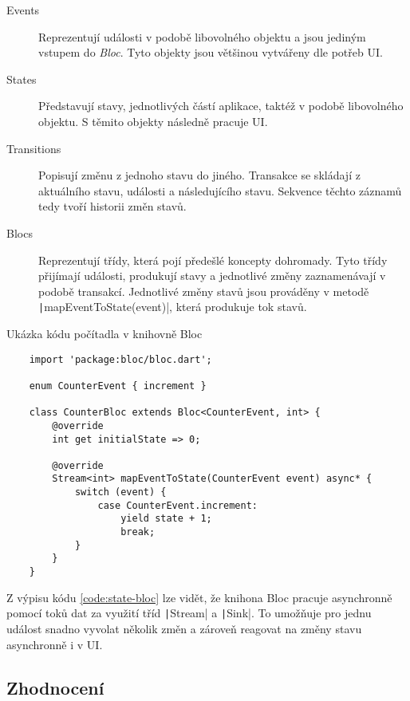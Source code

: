 \begin{description}
    \item[Events] Reprezentují události v podobě libovolného objektu
    a jsou jediným vstupem do \emph{Bloc}.
    Tyto objekty jsou většinou vytvářeny dle potřeb UI.
    \item[States] Představují stavy,
    jednotlivých částí aplikace,
    taktéž v podobě libovolného objektu.
    S těmito objekty následně pracuje UI.
    \item[Transitions] Popisují změnu z jednoho stavu do jiného.
    Transakce se skládají z aktuálního stavu, události a následujícího stavu.
    Sekvence těchto záznamů tedy tvoří historii změn stavů.
    \item[Blocs] Reprezentují třídy,
    která pojí předešlé koncepty dohromady.
    Tyto třídy přijímají události, produkují stavy a jednotlivé změny
    zaznamenávají v podobě transakcí.
    Jednotlivé změny stavů jsou prováděny v metodě
    \texttt|mapEventToState(event)|,
    která produkuje tok stavů.
\end{description}

\begin{listing}
    \caption{Ukázka kódu počítadla v knihovně Bloc
    \cite{bloclibrary_coreconcepts}}
    \label{code:state-bloc}
    \begin{verbatim}
    import 'package:bloc/bloc.dart';

    enum CounterEvent { increment }
    
    class CounterBloc extends Bloc<CounterEvent, int> {
        @override
        int get initialState => 0;
    
        @override
        Stream<int> mapEventToState(CounterEvent event) async* {
            switch (event) {
                case CounterEvent.increment:
                    yield state + 1;
                    break;
            }
        }
    }
    \end{verbatim}
\end{listing}

Z výpisu kódu \ref{code:state-bloc} lze vidět,
že knihona Bloc pracuje asynchronně pomocí toků dat za využití
tříd \texttt|Stream| a \texttt|Sink|.
To umožňuje pro jednu událost snadno vyvolat několik změn
a zároveň reagovat na změny stavu asynchronně i v UI.

\subsection{Zhodnocení}

